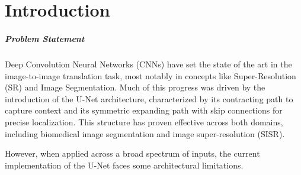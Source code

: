\chapter{Introduction}\label{introduction}

\paragraph{Problem Statement}

 Deep Convolution Neural Networks (CNNs) have set the state of the art in the image-to-image translation task, most notably in concepts like Super-Resolution (SR) and Image Segmentation. Much of this progress was driven by the introduction of the U-Net architecture, characterized by its contracting path to capture context and its symmetric expanding path with skip connections for precise localization. This structure has proven effective across both domains, including biomedical image segmentation\cite{ronneberger2015unet} and image super-resolution (SISR)\cite{super1}.


However, when applied across a broad spectrum of inputs, the current implementation of the U-Net faces some architectural limitations. 

